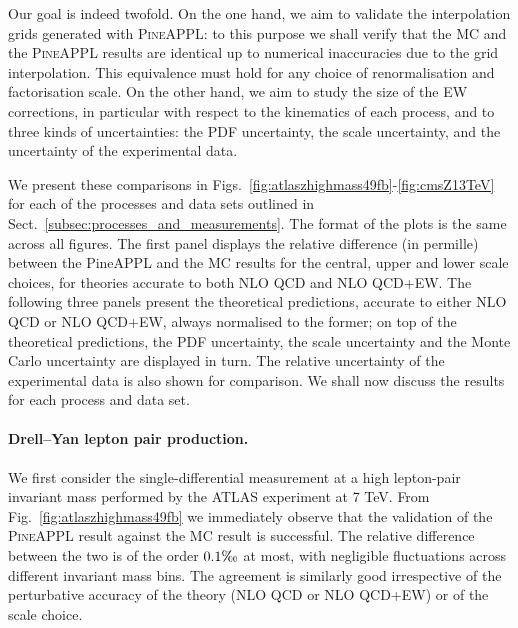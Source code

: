 Our goal is indeed twofold. On the one hand, we aim to validate the
interpolation grids generated with \textsc{PineAPPL}: to this purpose we shall
verify that the MC and the \textsc{PineAPPL} results are identical up to
numerical inaccuracies due to the grid interpolation. This equivalence must
hold for any choice of renormalisation and factorisation scale. On the other
hand, we aim to study the size of the EW corrections, in particular with
respect to the kinematics of each process, and to three kinds of uncertainties:
the PDF uncertainty, the scale uncertainty, and the uncertainty of the
experimental data.

We present these comparisons in
Figs.~\ref{fig:atlaszhighmass49fb}-\ref{fig:cmsZ13TeV} for each of the processes
and data sets outlined in Sect.~\ref{subsec:processes_and_measurements}.
The format of the plots is the same across all figures. The first panel
displays the relative difference (in permille) between the {\sc PineAPPL} and
the {\sc MC} results for the central, upper and lower scale choices, for
theories accurate to both NLO QCD and NLO QCD+EW. The following three panels
present the theoretical predictions, accurate to either NLO QCD or NLO QCD+EW,
always normalised to the former; on top of the theoretical predictions, the
PDF uncertainty, the scale uncertainty and the Monte Carlo uncertainty are
displayed in turn. The relative uncertainty of the experimental data is
also shown for comparison. We shall now discuss the results for each
process and data set.

\paragraph{Drell--Yan lepton pair production.} 

We first consider the single-differential measurement at a high lepton-pair
invariant mass performed by the ATLAS experiment at 7 TeV. 
From Fig.~\ref{fig:atlaszhighmass49fb} we immediately
observe that the validation of the \textsc{PineAPPL} result against the MC
result is successful. The relative difference between the two is of the order
$0.1\tcperthousand$ at most, with negligible fluctuations across different
invariant mass bins. The agreement is similarly good irrespective of the
perturbative accuracy of the theory (NLO QCD or NLO QCD+EW) or of the scale
choice.

